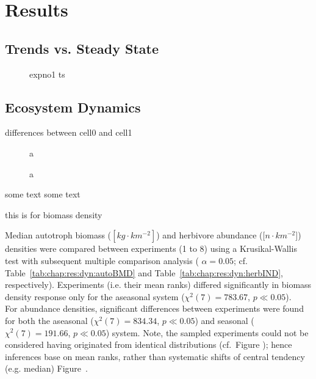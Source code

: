\chapter{Results}
\label{chap:res}


\section{Trends vs. Steady State}
\label{chap:res:dyn:trend}

\begin{figure}
\centering

\caption{expno1 ts}
\label{fig:chap:res:ts:expno1}
\end{figure}


\section{Ecosystem Dynamics}
\label{chap:res:dyn} 
differences between cell0 and cell1

\begin{figure}
\centering

\caption{a}
\label{fig:chap:res:dyn:avg}
\end{figure}


\begin{figure}
\centering

\caption{a}
\label{fig:chap:res:dyn}
\end{figure}


some text some text




this is for biomass density



Median autotroph biomass ($[kg\cdot km^{-2}]$) and herbivore abundance ($[n\cdot km^{-2}$]) densities were compared between experiments (1 to 8) using a Krusikal-Wallis test with subsequent multiple comparison analysis ( $\alpha = 0.05$; cf. Table~\ref{tab:chap:res:dyn:autoBMD} and Table~\ref{tab:chap:res:dyn:herbIND}, respectively). 
Experiments (i.e. their mean ranks) differed significantly in biomass density response only for the aseasonal  system ($\chi^{2}(7) = 783.67$, $p \ll 0.05$). 
\\
For abundance densities, significant differences between experiments were found for both the aseasonal ($\chi^{2}(7) = 834.34$, $p \ll 0.05$) and seasonal ($\chi^{2}(7) = 191.66$, $p \ll 0.05$) system. 
Note, the sampled experiments could not be considered having originated from identical distributions (cf.~Figure ); 
hence inferences base on mean ranks, rather than systematic shifts of central tendency (e.g. median) Figure~.

